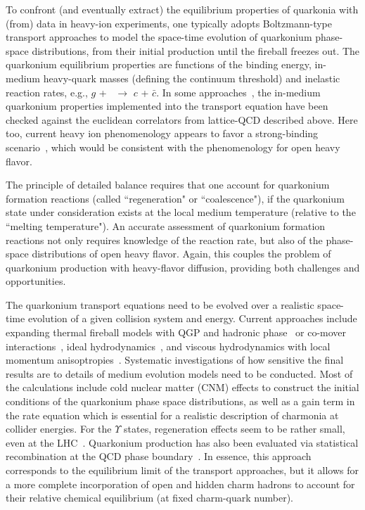 To confront (and eventually extract) the equilibrium properties of quarkonia with (from) 
data in heavy-ion experiments, one typically adopts Boltzmann-type transport approaches to 
model the space-time evolution of quarkonium phase-space distributions, from their initial
production until the fireball freezes out. The quarkonium equilibrium properties 
are functions of 
the binding energy, in-medium heavy-quark masses (defining the continuum threshold) 
and inelastic reaction rates, e.g., $g$ + \Jpsi\ $\rightarrow$ $c$ + $\bar c$. In some 
approaches~\cite{Zhao:2010nk,Emerick:2011xu}, the in-medium quarkonium properties 
implemented into the transport equation have been checked against the euclidean correlators 
from lattice-QCD described above. Here too, current heavy ion phenomenology appears to favor a
strong-binding scenario~\cite{Zhao:2010nk,Liu:2010ej,Emerick:2011xu,Strickland:2011aa},
which would be consistent with the phenomenology for open heavy flavor.

The principle of detailed balance requires that one account for quarkonium formation reactions 
(called ``regeneration" or ``coalescence"), if the quarkonium state under 
consideration exists at the local medium temperature (relative to the ``melting temperature"). 
An accurate assessment of quarkonium formation reactions not only requires knowledge of the 
reaction rate, but also of the phase-space distributions of open heavy flavor. Again, this 
couples the problem of quarkonium production with heavy-flavor diffusion,
providing both challenges and opportunities. 

The quarkonium transport equations need to be evolved over a realistic space-time 
evolution of a given collision system and energy. Current approaches include expanding 
thermal fireball models with QGP and hadronic phase~\cite{Grandchamp:2003uw,Zhao:2010nk} 
or co-mover interactions~\cite{Capella:2007jv}, ideal hydrodynamics~\cite{Zhu:2004nw}, and
viscous hydrodynamics with local momentum anisoptropies~\cite{Strickland:2011aa}. Systematic investigations
of how sensitive the final results are to details of medium evolution models need to be 
conducted. Most of the calculations include cold nuclear matter (CNM) effects to construct 
the initial conditions of the quarkonium phase space distributions, as well as a gain 
term in the rate equation which is essential for a realistic description of charmonia 
at collider energies. For the $\Upsilon$ states, regeneration effects seem to be rather 
small, even at the LHC~\cite{Emerick:2011xu}.
Quarkonium production has also been evaluated via statistical recombination at the
QCD phase boundary~\cite{BraunMunzinger:2000px,Andronic:2003zv,Andronic:2007bi}. In essence,
this approach corresponds to the equilibrium limit of the transport approaches, but it 
allows for a more complete incorporation of open and hidden charm hadrons to account for 
their relative chemical equilibrium (at fixed charm-quark number).



